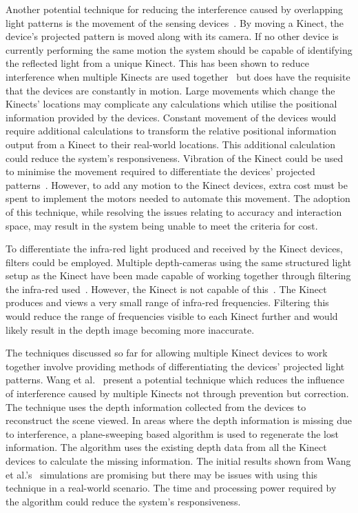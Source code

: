 \documentclass[link]{IWCOMP}
\begin{document}
Another potential technique for reducing the interference caused by overlapping light patterns is the movement of the sensing devices~\cite{Maimone2012}.
By moving a Kinect, the device's projected pattern is moved along with its camera.
If no other device is currently performing the same motion the system should be capable of identifying the reflected light from a unique Kinect.
This has been shown to reduce interference when multiple Kinects are used together~\cite{Maimone2012} but does have the requisite that the devices are constantly in motion.
Large movements which change the Kinects' locations may complicate any calculations which utilise the positional information provided by the devices.
Constant movement of the devices would require additional calculations to transform the relative positional information output from a Kinect to their real-world locations.
This additional calculation could reduce the system's responsiveness.
Vibration of the Kinect could be used to minimise the movement required to differentiate the devices' projected patterns~\cite{Kainz2012}.
However, to add any motion to the Kinect devices, extra cost must be spent to implement the motors needed to automate this movement.
The adoption of this technique, while resolving the issues relating to accuracy and interaction space, may result in the system being unable to meet the criteria for cost.

To differentiate the infra-red light produced and received by the Kinect devices, filters could be employed.
Multiple depth-cameras using the same structured light setup as the Kinect have been made capable of working together through filtering the infra-red used~\cite{Kim2008}.
However, the Kinect is not capable of this~\cite{Kainz2012}.
The Kinect produces and views a very small range of infra-red frequencies.
Filtering this would reduce the range of frequencies visible to each Kinect further and would likely result in the depth image becoming more inaccurate.

The techniques discussed so far for allowing multiple Kinect devices to work together involve providing methods of differentiating the devices' projected light patterns.
Wang et al.~\cite{Wang2012} present a potential technique which reduces the influence of interference caused by multiple Kinects not through prevention but correction.
The technique uses the depth information collected from the devices to reconstruct the scene viewed.
In areas where the depth information is missing due to interference, a plane-sweeping based algorithm is used to regenerate the lost information.
The algorithm uses the existing depth data from all the Kinect devices to calculate the missing information.
The initial results shown from Wang et al.'s~\cite{Wang2012} simulations are promising but there may be issues with using this technique in a real-world scenario.
The time and processing power required by the algorithm could reduce the system's responsiveness.
\end{document}
